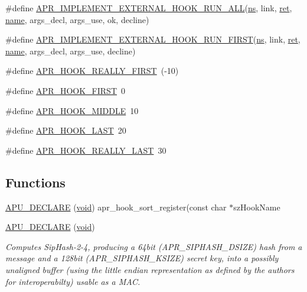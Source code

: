 \begin{DoxyCompactItemize}
\item 
\#define \hyperlink{group__APR__Util__Hook_gab466280bdabe0cc2ee5880cbb512fa3d}{A\+P\+R\+\_\+\+I\+M\+P\+L\+E\+M\+E\+N\+T\+\_\+\+E\+X\+T\+E\+R\+N\+A\+L\+\_\+\+H\+O\+O\+K\+\_\+\+R\+U\+N\+\_\+\+A\+LL}(\hyperlink{group__APR__Util__RC_ga16ebca092e717a050cdb4feb7bb59849}{ns},  link,  \hyperlink{group__APACHE__MPM_ga794c48ec324a4d85a40f38fe264d2a41}{ret},  \hyperlink{pcre_8txt_a5a15d68aadb41c771fe50a27c400d49b}{name},  args\+\_\+decl,  args\+\_\+use,  ok,  decline)
\item 
\#define \hyperlink{group__APR__Util__Hook_ga0420a2aa9ca6b3c1638bdb76025ecc57}{A\+P\+R\+\_\+\+I\+M\+P\+L\+E\+M\+E\+N\+T\+\_\+\+E\+X\+T\+E\+R\+N\+A\+L\+\_\+\+H\+O\+O\+K\+\_\+\+R\+U\+N\+\_\+\+F\+I\+R\+ST}(\hyperlink{group__APR__Util__RC_ga16ebca092e717a050cdb4feb7bb59849}{ns},  link,  \hyperlink{group__APACHE__MPM_ga794c48ec324a4d85a40f38fe264d2a41}{ret},  \hyperlink{pcre_8txt_a5a15d68aadb41c771fe50a27c400d49b}{name},  args\+\_\+decl,  args\+\_\+use,  decline)
\item 
\#define \hyperlink{group__APR__Util__Hook_gab004dcbfff32997deb15040e48f07e92}{A\+P\+R\+\_\+\+H\+O\+O\+K\+\_\+\+R\+E\+A\+L\+L\+Y\+\_\+\+F\+I\+R\+ST}~(-\/10)
\item 
\#define \hyperlink{group__APR__Util__Hook_ga564dea4803813674cb6b742f65a3d2b2}{A\+P\+R\+\_\+\+H\+O\+O\+K\+\_\+\+F\+I\+R\+ST}~0
\item 
\#define \hyperlink{group__APR__Util__Hook_gab9a5d50c3478c4d640deccec6b0ce879}{A\+P\+R\+\_\+\+H\+O\+O\+K\+\_\+\+M\+I\+D\+D\+LE}~10
\item 
\#define \hyperlink{group__APR__Util__Hook_gaa610a95f03d7b4aee922c28b0919f028}{A\+P\+R\+\_\+\+H\+O\+O\+K\+\_\+\+L\+A\+ST}~20
\item 
\#define \hyperlink{group__APR__Util__Hook_gae3c7d2cf35e8c89828dfff7a85b0ed77}{A\+P\+R\+\_\+\+H\+O\+O\+K\+\_\+\+R\+E\+A\+L\+L\+Y\+\_\+\+L\+A\+ST}~30
\end{DoxyCompactItemize}
\subsection*{Functions}
\begin{DoxyCompactItemize}
\item 
\hyperlink{group__APR__Util__Hook_gacf87dbe12a026276bca80232961576e6}{A\+P\+U\+\_\+\+D\+E\+C\+L\+A\+RE} (\hyperlink{group__MOD__ISAPI_gacd6cdbf73df3d9eed42fa493d9b621a6}{void}) apr\+\_\+hook\+\_\+sort\+\_\+register(const char $\ast$sz\+Hook\+Name
\item 
\hyperlink{group__APR__Util__Hook_gabd2528499ce66c68dc05d60927725a39}{A\+P\+U\+\_\+\+D\+E\+C\+L\+A\+RE} (\hyperlink{group__MOD__ISAPI_gacd6cdbf73df3d9eed42fa493d9b621a6}{void})
\begin{DoxyCompactList}\small\item\em Computes Sip\+Hash-\/2-\/4, producing a 64bit (A\+P\+R\+\_\+\+S\+I\+P\+H\+A\+S\+H\+\_\+\+D\+S\+I\+ZE) hash from a message and a 128bit (A\+P\+R\+\_\+\+S\+I\+P\+H\+A\+S\+H\+\_\+\+K\+S\+I\+ZE) secret key, into a possibly unaligned buffer (using the little endian representation as defined by the authors for interoperabilty) usable as a M\+AC. \end{DoxyCompactList}\end{DoxyCompactItemize}
